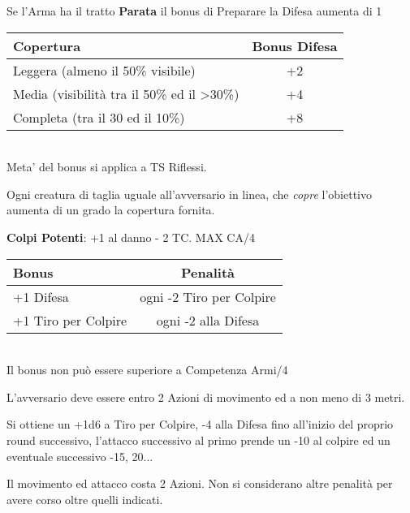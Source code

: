 \documentclass[landscape,10pt,a4paper]{article}
\begin{document}
\begin{multicols}{3}
\begin{dmbox}[title=Preparare la Difesa]
	Se l'Arma ha il tratto \textbf{Parata} il bonus di Preparare la Difesa aumenta di 1
\end{dmbox}		

\begin{dmbox}[title=Copertura]	
\noindent\begin{tabular}{l|c}
\textbf{Copertura} & \textbf{Bonus Difesa}\\
\hline
Leggera (almeno il 50\% visibile) & +2\\
Media (visibilità tra il 50\% ed il >30\%) & +4 \\
Completa (tra il 30 ed il 10\%) & +8 \\
\end{tabular}\\	

Meta' del bonus si applica a TS Riflessi.

Ogni creatura di taglia uguale all'avversario in linea, che \emph{copre} l'obiettivo aumenta di un grado la copertura fornita.	
	
\end{dmbox}

\begin{mybluebox}\textbf{Colpi Potenti}: +1 al danno - 2 TC. MAX CA/4\end{mybluebox}	
	

\begin{dmbox}[title=Maestria del combattimento]	
\noindent\begin{tabular}{l|c}
	\textbf{Bonus} & \textbf{Penalità}\\
		\hline
	+1 Difesa & ogni -2 Tiro per Colpire\\
	+1 Tiro per Colpire & ogni -2 alla Difesa
\end{tabular}\\	
	
Il bonus non può essere superiore a Competenza Armi/4
\end{dmbox}	
	
\begin{dmbox}[title=Carica]		
	
L'avversario deve essere entro 2 Azioni di movimento ed a non meno di 3 metri. 

Si ottiene un +1d6 a Tiro per Colpire, -4 alla Difesa fino all'inizio del proprio round successivo, l'attacco successivo al primo prende un -10 al colpire ed un eventuale successivo -15, 20...

Il movimento ed attacco costa 2 Azioni. Non si considerano altre penalità per avere corso oltre quelli indicati.


\end{dmbox}
\end{multicols}
\end{document}
